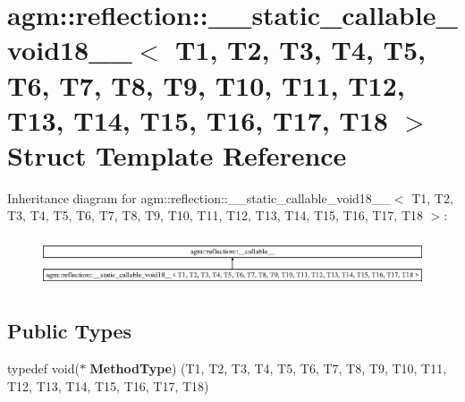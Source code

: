 \hypertarget{structagm_1_1reflection_1_1____static__callable__void18____}{}\section{agm\+:\+:reflection\+:\+:\+\_\+\+\_\+static\+\_\+callable\+\_\+void18\+\_\+\+\_\+$<$ T1, T2, T3, T4, T5, T6, T7, T8, T9, T10, T11, T12, T13, T14, T15, T16, T17, T18 $>$ Struct Template Reference}
\label{structagm_1_1reflection_1_1____static__callable__void18____}
Inheritance diagram for agm\+:\+:reflection\+:\+:\+\_\+\+\_\+static\+\_\+callable\+\_\+void18\+\_\+\+\_\+$<$ T1, T2, T3, T4, T5, T6, T7, T8, T9, T10, T11, T12, T13, T14, T15, T16, T17, T18 $>$\+:\begin{figure}[H]
\begin{center}
\leavevmode
\includegraphics[height=1.487384cm]{structagm_1_1reflection_1_1____static__callable__void18____}
\end{center}
\end{figure}
\subsection*{Public Types}
\begin{DoxyCompactItemize}
\item 
typedef void($\ast$ {\bfseries Method\+Type}) (T1, T2, T3, T4, T5, T6, T7, T8, T9, T10, T11, T12, T13, T14, T15, T16, T17, T18)\hypertarget{structagm_1_1reflection_1_1____static__callable__void18_____a2d18fc2b1618833042d221e40e86eae7}{}\label{structagm_1_1reflection_1_1____static__callable__void18_____a2d18fc2b1618833042d221e40e86eae7}

\end{DoxyCompactItemize}
